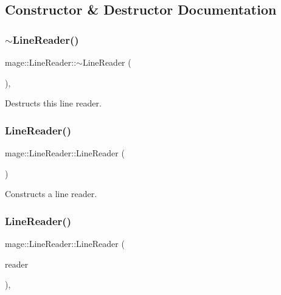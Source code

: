 \subsection{Constructor \& Destructor Documentation}
\hypertarget{classmage_1_1_line_reader_ad9753ea392ebe5b3867852d3392fb1e7}{}\label{classmage_1_1_line_reader_ad9753ea392ebe5b3867852d3392fb1e7} 
\subsubsection{\texorpdfstring{$\sim$\+Line\+Reader()}{~LineReader()}}
{\footnotesize\ttfamily mage\+::\+Line\+Reader\+::$\sim$\+Line\+Reader (\begin{DoxyParamCaption}{ }\end{DoxyParamCaption})\hspace{0.3cm}{\ttfamily [virtual]}, {\ttfamily [default]}}

Destructs this line reader. \hypertarget{classmage_1_1_line_reader_ab4a46321d7ea3ecda2d6390c78a7285b}{}\label{classmage_1_1_line_reader_ab4a46321d7ea3ecda2d6390c78a7285b} 
\subsubsection{\texorpdfstring{Line\+Reader()}{LineReader()}\hspace{0.1cm}{\footnotesize\ttfamily [1/3]}}
{\footnotesize\ttfamily mage\+::\+Line\+Reader\+::\+Line\+Reader (\begin{DoxyParamCaption}{ }\end{DoxyParamCaption})\hspace{0.3cm}{\ttfamily [protected]}}

Constructs a line reader. \hypertarget{classmage_1_1_line_reader_ae4f871bebae110704b34c0bd88460639}{}\label{classmage_1_1_line_reader_ae4f871bebae110704b34c0bd88460639} 
\subsubsection{\texorpdfstring{Line\+Reader()}{LineReader()}\hspace{0.1cm}{\footnotesize\ttfamily [2/3]}}
{\footnotesize\ttfamily mage\+::\+Line\+Reader\+::\+Line\+Reader (\begin{DoxyParamCaption}\item[{const \hyperlink{classmage_1_1_line_reader}{Line\+Reader} \&}]{reader }\end{DoxyParamCaption})\hspace{0.3cm}{\ttfamily [protected]}, {\ttfamily [delete]}}

